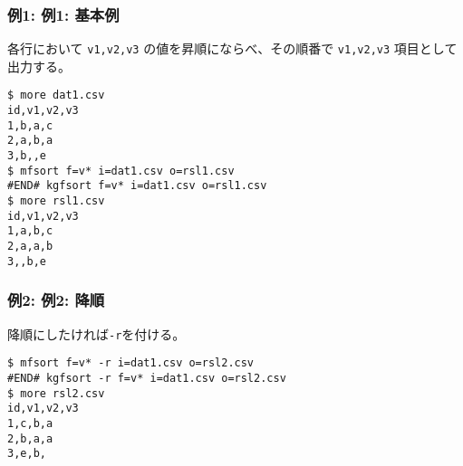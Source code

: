 \subsubsection*{例1: 例1: 基本例}

各行において \verb|v1,v2,v3| の値を昇順にならべ、その順番で \verb|v1,v2,v3| 項目として出力する。


\begin{Verbatim}[baselinestretch=0.7,frame=single]
$ more dat1.csv
id,v1,v2,v3
1,b,a,c
2,a,b,a
3,b,,e
$ mfsort f=v* i=dat1.csv o=rsl1.csv
#END# kgfsort f=v* i=dat1.csv o=rsl1.csv
$ more rsl1.csv
id,v1,v2,v3
1,a,b,c
2,a,a,b
3,,b,e
\end{Verbatim}
\subsubsection*{例2: 例2: 降順}

降順にしたければ\verb|-r|を付ける。


\begin{Verbatim}[baselinestretch=0.7,frame=single]
$ mfsort f=v* -r i=dat1.csv o=rsl2.csv
#END# kgfsort -r f=v* i=dat1.csv o=rsl2.csv
$ more rsl2.csv
id,v1,v2,v3
1,c,b,a
2,b,a,a
3,e,b,
\end{Verbatim}
